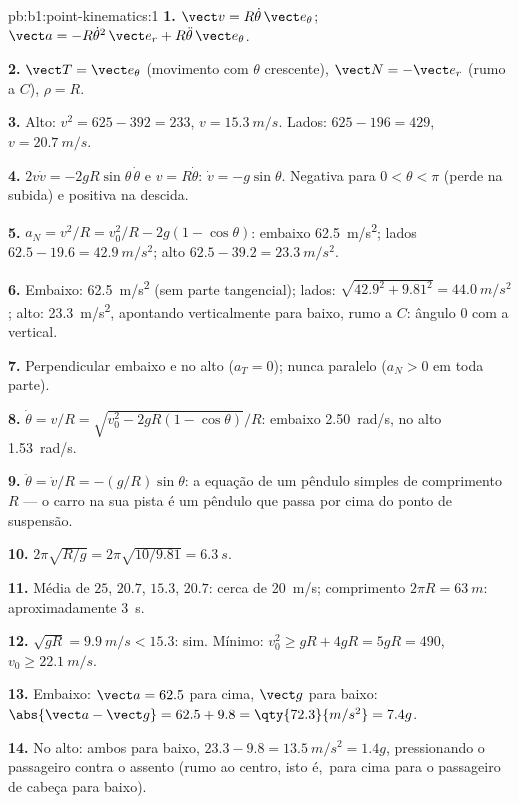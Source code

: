 \begin{solution}{pb:b1:point-kinematics:1}
\textbf{1.} $\vect v = R\dot\theta\,\vect e_\theta$; $\vect a = -R\dot\theta^2
\,\vect e_r + R\ddot\theta\,\vect e_\theta$.

\textbf{2.} $\vect T = \vect e_\theta$ (movimento com $\theta$ crescente),
$\vect N = -\vect e_r$ (rumo a $C$), $\rho = R$.

\textbf{3.} Alto: $v^2 = 625 - 392 = 233$, $v = \qty{15.3}{m/s}$. Lados:
$625 - 196 = 429$, $v = \qty{20.7}{m/s}$.

\textbf{4.} $2v\dot v = -2gR\sin\theta\,\dot\theta$ e $v = R\dot\theta$:
$\dot v = -g\sin\theta$. Negativa para $0 < \theta < \pi$ (perde  na
subida) e positiva na descida.

\textbf{5.} $a_N = v^2/R = v_0^2/R - 2g(1 - \cos\theta)$: embaixo
\qty{62.5}{m/s^2}; lados $62.5 - 19.6 = \qty{42.9}{m/s^2}$; alto $62.5 -
39.2 = \qty{23.3}{m/s^2}$.

\textbf{6.} Embaixo: \qty{62.5}{m/s^2} (sem parte tangencial); lados:
$\sqrt{42.9^2 + 9.81^2} = \qty{44.0}{m/s^2}$; alto: \qty{23.3}{m/s^2},
apontando verticalmente para baixo, rumo a $C$: ângulo $0$ com a vertical.

\textbf{7.} Perpendicular embaixo e no alto ($a_T = 0$); nunca
paralelo ($a_N > 0$ em toda parte).

\textbf{8.} $\dot\theta = v/R = \sqrt{v_0^2 - 2gR(1 - \cos\theta)}/R$:
embaixo \qty{2.50}{rad/s}, no alto \qty{1.53}{rad/s}.

\textbf{9.} $\ddot\theta = \dot v/R = -(g/R)\sin\theta$: a equação de um
pêndulo simples de comprimento $R$ --- o carro na sua pista é um pêndulo
que passa por cima do ponto de suspensão.

\textbf{10.} $2\pi\sqrt{R/g} = 2\pi\sqrt{10/9.81} = \qty{6.3}{s}$.

\textbf{11.} Média de $25$, $20.7$, $15.3$, $20.7$: cerca de \qty{20}{m/s};
comprimento $2\pi R = \qty{63}{m}$: aproximadamente \qty{3}{s}.

\textbf{12.} $\sqrt{gR} = \qty{9.9}{m/s} < 15.3$: sim. Mínimo: $v_0^2 \geq
gR + 4gR = 5gR = 490$, $v_0 \geq \qty{22.1}{m/s}$.

\textbf{13.} Embaixo: $\vect a = 62.5$ para cima, $\vect g$ para baixo:
$\abs{\vect a - \vect g} = 62.5 + 9.8 = \qty{72.3}{m/s^2} = 7.4g$.

\textbf{14.} No alto: ambos para baixo, $23.3 - 9.8 = \qty{13.5}{m/s^2} = 1.4g$,
pressionando o passageiro contra o assento (rumo ao centro, isto é,\ para cima
para o passageiro de cabeça para baixo).


\end{solution}
